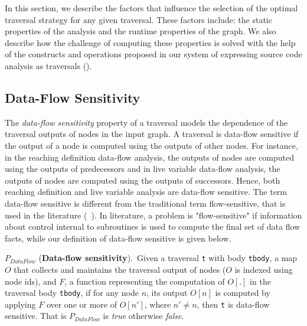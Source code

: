 In this section, we describe the factors that influence the selection of the
optimal traversal strategy for any given traversal. These factors include: the
static properties of the analysis and the runtime properties of the graph. We
also describe how the challenge of computing these properties is solved with the
help of the constructs and operations proposed in our system of expressing
source code analysis as traversals ().
% 
% 

\subsection{Data-Flow Sensitivity}
The {\em data-flow sensitivity} property of a traversal models the dependence of
the traversal outputs of nodes in the input graph. A traversal is data-flow
sensitive if the output of a node is computed using the outputs of other
nodes. For instance, in the reaching definition data-flow analysis, the outputs
of nodes are computed using the outputs of predecessors and in live variable
data-flow analysis, the outputs of nodes are computed using the outputs of
successors. Hence, both reaching definition and live variable analysis are
data-flow sensitive. The term data-flow sensitive is different from the traditional term flow-sensitive, that is used in the literature (~\cite{choi1993efficient}). In literature, a problem is "flow-sensitive" if information about control internal to subroutines is used to compute the final set of data flow facts, while our definition of data-flow sensitive is given below.


\begin{definition}\label{def:dataflow}
$P_{DataFlow}$ (\textbf{Data-flow sensitivity}).\ Given a traversal
\lstinline|t| with body \lstinline|tbody|, a map $O$ that collects and maintains
the traversal output of nodes ($O$ is indexed using node ids), and $F$, a
function representing the computation of $O[.]$ in the traversal body
\lstinline|tbody|, if for any node $n$, its output $O[n]$ is computed by
applying $F$ over one or more of $O[n']$, where $n' \neq n$, then \lstinline|t|
is data-flow sensitive. That is $P_{DataFlow}$ is \textit{true} otherwise
\textit{false}.
\end{definition}
% 

